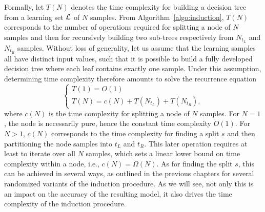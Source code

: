 Formally, let $T(N)$ denotes the time complexity for building a decision tree from a
learning set ${\cal L}$ of $N$ samples. From Algorithm~\ref{algo:induction},
$T(N)$ corresponds to the number of operations required for splitting a node of $N$ samples and then for recursively
building two sub-trees respectively from $N_{t_L}$ and $N_{t_R}$ samples. Without
loss of generality, let us assume that the learning samples all have distinct
input values, such that it is possible to build a fully developed decision tree
where each leaf contains exactly one sample. Under this assumption, determining
time complexity therefore amounts to solve the recurrence equation
\begin{equation}\label{eqn:complexity:rec}
\begin{cases}
T(1) = O(1) \\
T(N) = c(N) + T(N_{t_L}) + T(N_{t_R}),
\end{cases}
\end{equation}
where $c(N)$ is the time complexity for splitting a node of $N$ samples. For
$N=1$, the node is necessarily pure, hence the constant time complexity $O(1)$.
For $N>1$, $c(N)$ corresponds to the time complexity for finding a split $s$
and then partitioning the node samples into ${t_L}$ and ${t_R}$. This later
operation requires at least to iterate over all $N$ samples, which sets a
linear lower bound on time complexity within a node, i.e., $c(N)=\Omega(N)$. As
for finding the split $s$, this can be achieved in several ways, as outlined in
the previous chapters  for several randomized variants of the induction
procedure. As we will see, not only this is an impact on the accuracy of the
resulting model, it also drives the time complexity of the induction procedure.

